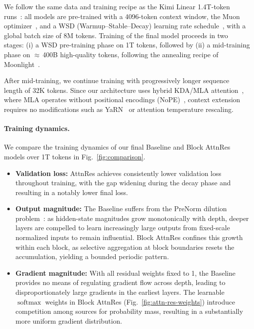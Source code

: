 We follow the same data and training recipe as the Kimi Linear 1.4T-token runs~\citep{zhang2025kimi}: all models are pre-trained with a 4096-token context window, the Muon optimizer~\citep{liu-2025-moonlight}, and a WSD (Warmup--Stable--Decay) learning rate schedule~\citep{hu2024minicpm}, with a global batch size of 8M tokens. 
Training of the final model proceeds in two stages: (i) a WSD pre-training phase on 1T tokens, followed by (ii) a mid-training phase on ${\approx}\,$400B high-quality tokens, following the annealing recipe of Moonlight~\citep{liu-2025-moonlight}.

After mid-training, we continue training with progressively longer sequence length of 32K tokens. Since our architecture uses hybrid KDA/MLA attention~\citep{zhang2025kimi}, where MLA operates without positional encodings (NoPE)~\cite{yang2025ropenopeagainnew}, context extension requires no modifications such as YaRN~\citep{peng2023yarn} or attention temperature rescaling.

\label{sec:main}



\paragraph{Training dynamics.}
We compare the training dynamics of our final Baseline and Block AttnRes models over 1T tokens in Fig.~\ref{fig:comparison}.
\begin{itemize}[leftmargin=*]
    \item \textbf{Validation loss:} AttnRes achieves consistently lower validation loss throughout training, with the gap widening during the decay phase and resulting in a notably lower final loss.
    \item \textbf{Output magnitude:} The Baseline suffers from the PreNorm dilution problem~\citep{xiong2020layer,li2026siamesenorm}: as hidden-state magnitudes grow monotonically with depth, deeper layers are compelled to learn increasingly large outputs from fixed-scale normalized inputs to remain influential. Block AttnRes confines this growth within each block, as selective aggregation at block boundaries resets the accumulation, yielding a bounded periodic pattern.
    \item \textbf{Gradient magnitude:} With all residual weights fixed to 1, the Baseline provides no means of regulating gradient flow across depth, leading to disproportionately large gradients in the earliest layers. The learnable $\operatorname{softmax}$ weights in Block AttnRes (Fig.~\ref{fig:attn-res-weights}) introduce competition among sources for probability mass, resulting in a substantially more uniform gradient distribution.
\end{itemize}

